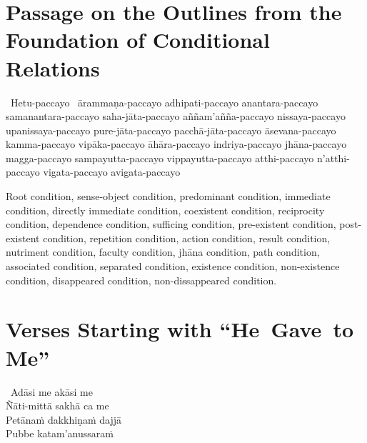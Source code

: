\suttaRef{[SN 12.1]}



\section[Passage on the Outlines from the Foundation\\ of Conditional Relations]{Passage on the Outlines from the Foundation of Conditional Relations}
\label{foundation-of-conditional-relations}

\begin{pali-hang-together}
  \anglebracketleft\ \hspace{-0.5mm}Hetu-paccayo \hspace{-0.5mm}\anglebracketright\ ārammaṇa-paccayo adhipati-paccayo anantara-paccayo samanantara-paccayo saha-jāta-paccayo aññam'añña-paccayo nissaya-paccayo upanissaya-paccayo pure-jāta-paccayo pacchā-jāta-paccayo āsevana-paccayo kamma-paccayo vipāka-paccayo āhāra-paccayo indriya-paccayo jhāna-paccayo magga-paccayo sampayutta-paccayo vippayutta-paccayo atthi-paccayo n'atthi-paccayo vigata-paccayo avigata-paccayo
\end{pali-hang-together}

\begin{english-hang-verses}
  Root condition, sense-object condition, predominant condition, immediate condition, directly immediate condition, coexistent condition, reciprocity condition, dependence condition, sufficing condition, pre-existent condition, post-existent condition, repetition condition, action condition, result condition, nutriment condition, faculty condition, jhāna condition, path condition, \ifninebythirteen\clearpage\fi associated condition, separated condition, existence condition, non-existence condition, disappeared condition, non-dissappeared condition.
\end{english-hang-verses}

\ifninebythirteen\vspace{-1em}\fi

\suttaRef{[Dhs A]}



\section{Verses Starting with \mbox{``He}~Gave~to Me''}
\label{he-gave-to-me}

\begin{pali-hang-together}
  \anglebracketleft\ \hspace{-0.5mm}Adāsi me akāsi me \hspace{-0.5mm}\anglebracketright\ \\
  Ñāti-mittā sakhā ca me\\
  Petānaṁ dakkhiṇaṁ dajjā\\
  Pubbe katam'anussaraṁ
\end{pali-hang-together}

